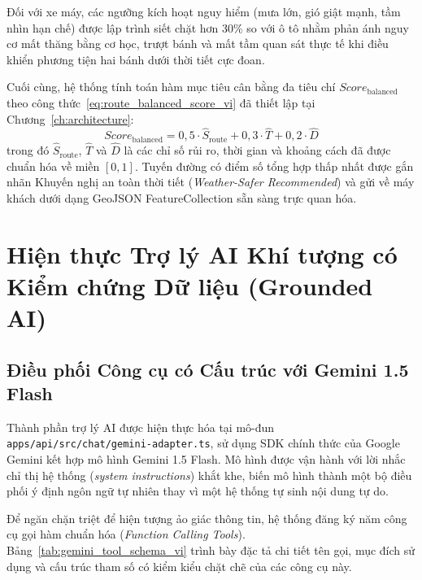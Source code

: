 Đối với xe máy, các ngưỡng kích hoạt nguy hiểm (mưa lớn, gió giật mạnh, tầm nhìn hạn chế) được lập trình siết chặt hơn 30\% so với ô tô nhằm phản ánh nguy cơ mất thăng bằng cơ học, trượt bánh và mất tầm quan sát thực tế khi điều khiển phương tiện hai bánh dưới thời tiết cực đoan.

Cuối cùng, hệ thống tính toán hàm mục tiêu cân bằng đa tiêu chí $Score_{\text{balanced}}$ theo công thức~\eqref{eq:route_balanced_score_vi} đã thiết lập tại Chương~\ref{ch:architecture}:
\begin{equation}
Score_{\text{balanced}} = 0{,}5 \cdot \hat{S}_{\text{route}} + 0{,}3 \cdot \hat{T} + 0{,}2 \cdot \hat{D}
\end{equation}
trong đó $\hat{S}_{\text{route}}$, $\hat{T}$ và $\hat{D}$ là các chỉ số rủi ro, thời gian và khoảng cách đã được chuẩn hóa về miền $[0, 1]$. Tuyến đường có điểm số tổng hợp thấp nhất được gắn nhãn Khuyến nghị an toàn thời tiết (\textit{Weather-Safer Recommended}) và gửi về máy khách dưới dạng GeoJSON FeatureCollection sẵn sàng trực quan hóa.

\section{Hiện thực Trợ lý AI Khí tượng có Kiểm chứng Dữ liệu (Grounded AI)}
\label{sec:grounded_ai_impl}

\subsection{Điều phối Công cụ có Cấu trúc với Gemini 1.5 Flash}
Thành phần trợ lý AI được hiện thực hóa tại mô-đun \texttt{apps/api/src/chat/}\allowbreak\texttt{gemini-}\allowbreak\texttt{adapter.ts}, sử dụng SDK chính thức của Google Gemini kết hợp mô hình Gemini 1.5 Flash. Mô hình được vận hành với lời nhắc chỉ thị hệ thống (\textit{system instructions}) khắt khe, biến mô hình thành một bộ điều phối ý định ngôn ngữ tự nhiên thay vì một hệ thống tự sinh nội dung tự do.

Để ngăn chặn triệt để hiện tượng ảo giác thông tin, hệ thống đăng ký năm công cụ gọi hàm chuẩn hóa (\textit{Function Calling Tools}). Bảng~\ref{tab:gemini_tool_schema_vi} trình bày đặc tả chi tiết tên gọi, mục đích sử dụng và cấu trúc tham số có kiểm kiểu chặt chẽ của các công cụ này.

